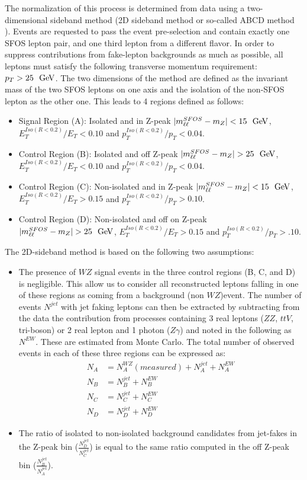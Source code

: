 The normalization of this process is determined from data using a two-dimensional sideband method (2D sideband method or so-called ABCD method~
). Events are requested to pass the event pre-selection and contain exactly one SFOS lepton pair, and one third lepton from a different flavor. In order to suppress contributions from fake-lepton backgrounds as much as possible, all leptons must satisfy the following transverse momentum requirement: $p_{T}>25~\GeV$. The two dimensions of the method are defined as the invariant mass of the two SFOS leptons on one axis and the isolation of the non-SFOS lepton as the other one. This leads to 4 regions defined as follows:
\begin{itemize}
	\item Signal Region (A): Isolated and in Z-peak $|m_{\ell\ell}^{SFOS}-m_{Z}|<15~\GeV$, $E_{T}^{Iso(R<0.2)}/E_{T}<0.10$ and $p_{T}^{Iso(R<0.2)}/p_{T}<0.04$.
	\item Control Region (B): Isolated and off Z-peak $|m_{\ell\ell}^{SFOS}-m_{Z}|>25~\GeV$, $E_{T}^{Iso(R<0.2)}/E_{T}<0.10$ and $p_{T}^{Iso(R<0.2)}/p_{T}<0.04$.
	\item Control Region (C): Non-isolated and in Z-peak $|m_{\ell\ell}^{SFOS}-m_{Z}|<15~\GeV$, $E_{T}^{Iso(R<0.2)}/E_{T}>0.15$ and $p_{T}^{Iso(R<0.2)}/p_{T}>0.10$.
	\item Control Region (D): Non-isolated and off on Z-peak $|m_{\ell\ell}^{SFOS}-m_{Z}|>25~\GeV$, $E_{T}^{Iso(R<0.2)}/E_{T}>0.15$ and $p_{T}^{Iso(R<0.2)}/p_{T}>.10$.
\end{itemize}


The 2D-sideband method is based on the following two assumptions:
\begin{itemize}
\item The presence of $WZ$ signal events in the three control regions (B,
  C, and D) is negligible. This allow us to consider all
  reconstructed leptons falling in one of these regions as coming from a
  background (non $WZ$)event. The number of events $N^{jet}$ with jet faking leptons can then
  be extracted by subtracting from the data the contribution from processes containing 
  3 real leptons ($ZZ$, $ttV$, tri-boson) or 2 real lepton and 1 photon ($Z\gamma$)
  and noted in the following as $N^{EW}$. These are estimated from Monte Carlo. The total number of
  observed events in each of these three regions can be expressed as:
  \begin{align}
  N_A &= N_A^{WZ}(measured)+N_A^{jet}+N_A^{EW} \\
  N_B &= N_B^{jet}+N_B^{EW} \\
  N_C &= N_C^{jet}+N_C^{EW} \\
  N_D &= N_D^{jet}+N_D^{EW} 
  \end{align}

\item The ratio of isolated to non-isolated background candidates from
  jet-fakes in the Z-peak bin ($\frac{N_D^{jet}}{N_C^{jet}}$)
  is equal to the same ratio computed in the off Z-peak bin ($\frac{N_B^{jet}}{N_A^{jet}}$).
\end{itemize}

